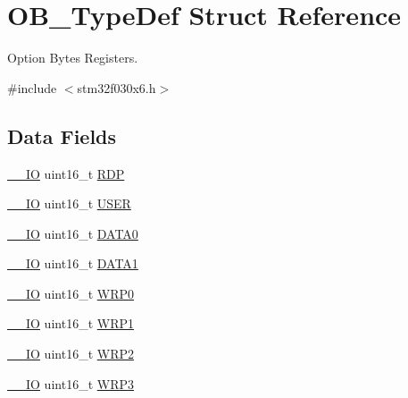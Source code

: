 \hypertarget{struct_o_b___type_def}{}\section{O\+B\+\_\+\+Type\+Def Struct Reference}
\label{struct_o_b___type_def}


Option Bytes Registers.  




{\ttfamily \#include $<$stm32f030x6.\+h$>$}

\subsection*{Data Fields}
\begin{DoxyCompactItemize}
\item 
\hyperlink{core__sc300_8h_aec43007d9998a0a0e01faede4133d6be}{\+\_\+\+\_\+\+IO} uint16\+\_\+t \hyperlink{struct_o_b___type_def_ae708f301b866ad2a81ed39efba639aab}{R\+DP}
\item 
\hyperlink{core__sc300_8h_aec43007d9998a0a0e01faede4133d6be}{\+\_\+\+\_\+\+IO} uint16\+\_\+t \hyperlink{struct_o_b___type_def_a67442d4e459bba2c40fa62914d78ec1e}{U\+S\+ER}
\item 
\hyperlink{core__sc300_8h_aec43007d9998a0a0e01faede4133d6be}{\+\_\+\+\_\+\+IO} uint16\+\_\+t \hyperlink{struct_o_b___type_def_ac91ac63aaf885d7290d9903fc5bd9515}{D\+A\+T\+A0}
\item 
\hyperlink{core__sc300_8h_aec43007d9998a0a0e01faede4133d6be}{\+\_\+\+\_\+\+IO} uint16\+\_\+t \hyperlink{struct_o_b___type_def_a4fc75d06d435365a28ac018fdc0730cf}{D\+A\+T\+A1}
\item 
\hyperlink{core__sc300_8h_aec43007d9998a0a0e01faede4133d6be}{\+\_\+\+\_\+\+IO} uint16\+\_\+t \hyperlink{struct_o_b___type_def_ad43c7a196f0eef88b3038383c4f7d903}{W\+R\+P0}
\item 
\hyperlink{core__sc300_8h_aec43007d9998a0a0e01faede4133d6be}{\+\_\+\+\_\+\+IO} uint16\+\_\+t \hyperlink{struct_o_b___type_def_ac4e091dcb644dbb5d4a2c7aca7d4fe88}{W\+R\+P1}
\item 
\hyperlink{core__sc300_8h_aec43007d9998a0a0e01faede4133d6be}{\+\_\+\+\_\+\+IO} uint16\+\_\+t \hyperlink{struct_o_b___type_def_a05486d021c6761bf5a04f410a1c24e06}{W\+R\+P2}
\item 
\hyperlink{core__sc300_8h_aec43007d9998a0a0e01faede4133d6be}{\+\_\+\+\_\+\+IO} uint16\+\_\+t \hyperlink{struct_o_b___type_def_a7d9c1634a4c6027e12345f25d9d15b4d}{W\+R\+P3}
\end{DoxyCompactItemize}


